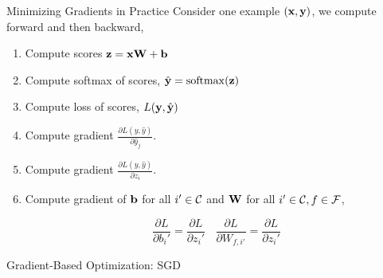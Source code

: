 \documentclass{beamer}
\begin{document}
\begin{frame}{Minimizing Gradients in Practice}
  Consider one example $(\mathbf{x}, \mathbf{y})$, we compute forward and then backward,

  \begin{enumerate}
  \item Compute scores $\mathbf{z} =  \mathbf{x} \mathbf{W} + \mathbf{b}$  
  \item Compute softmax of scores, $\hat{\boldy} = \softmax(\boldz)$  
  \item Compute loss of scores, $L(\mathbf{y}, \hat{\mathbf{y}})$  

  \pause
  \item Compute gradient $\frac{\partial L(y, \hat{y})}{\partial \hat{y}_j}$.

  \item Compute gradient $\frac{\partial L(y, \hat{y})}{\partial z_i}$.

  \item Compute gradient of $\mathbf{b}$ for all $i'\in \mathcal{C}$ and $\mathbf{W}$ for all $i'\in \mathcal{C}, f \in \mathcal{F}$, 

  \[\frac{\partial L}{\partial b_i'} = 
    \frac{\partial L}{\partial z_i'} \ \ \ \ \frac{\partial L}{\partial W_{f, i'}} = 
     \frac{\partial L}{\partial z_i'}\]

  \end{enumerate}
\end{frame}

\begin{frame}{Gradient-Based Optimization: SGD}
  \begin{figure}
    \begin{algorithmic}
      \EndWhile{}
      \State{\Return{$\theta$}}
      \EndProcedure{}
    \end{algorithmic}
  \end{figure}
\end{frame}
\end{document}
